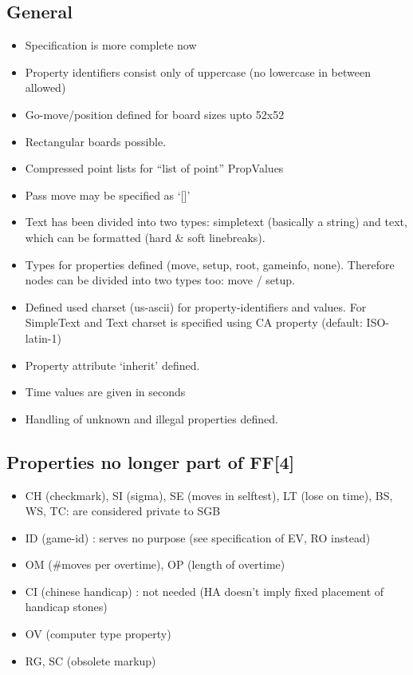 \subsection{General}\label{general}

\begin{itemize}
\item
  Specification is more complete now
\item
  Property identifiers consist only of uppercase (no lowercase in
  between allowed)
\item
  Go-move/position defined for board sizes upto 52x52
\item
  Rectangular boards possible.
\item
  Compressed point lists for ``list of point'' PropValues
\item
  Pass move may be specified as `{[}{]}'
\item
  Text has been divided into two types: simpletext (basically a string)
  and text, which can be formatted (hard \& soft linebreaks).
\item
  Types for properties defined (move, setup, root, gameinfo, none).
  Therefore nodes can be divided into two types too: move / setup.
\item
  Defined used charset (us-ascii) for property-identifiers and values.
  For SimpleText and Text charset is specified using CA property
  (default: ISO-latin-1)
\item
  Property attribute `inherit' defined.
\item
  Time values are given in seconds
\item
  Handling of unknown and illegal properties defined.
\end{itemize}

\subsection{Properties no longer part of
FF{[}4{]}}\label{properties-no-longer-part-of-ff4}

\begin{itemize}
\item
  CH (checkmark), SI (sigma), SE (moves in selftest), LT (lose on time),
  BS, WS, TC: are considered private to SGB
\item
  ID (game-id) : serves no purpose (see specification of EV, RO instead)
\item
  OM (\#moves per overtime), OP (length of overtime)
\item
  CI (chinese handicap) : not needed (HA doesn't imply fixed placement
  of handicap stones)
\item
  OV (computer type property)
\item
  RG, SC (obsolete markup)
\end{itemize}

